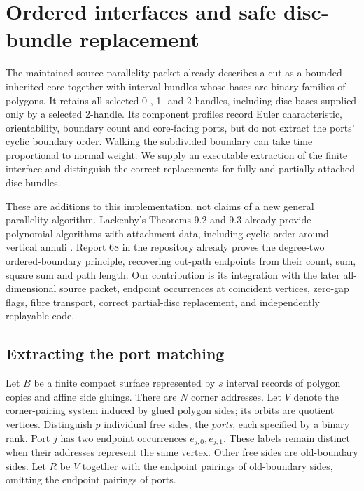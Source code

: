 \section{Ordered interfaces and safe disc-bundle replacement}
\label{sec:parallelity-interface}

The maintained source parallelity packet already describes a cut as a
bounded inherited core together with interval bundles whose bases are
binary families of polygons.  It retains all selected 0-, 1- and 2-handles,
including disc bases supplied only by a selected 2-handle.  Its component
profiles record Euler characteristic, orientability, boundary count and
core-facing ports, but do not extract the ports' cyclic boundary order.
Walking the subdivided boundary can take time proportional to normal weight.
We supply an executable extraction of the finite interface and distinguish
the correct replacements for fully and partially attached disc bundles.

These are additions to this implementation, not claims of a new general
parallelity algorithm.  Lackenby's Theorems 9.2 and 9.3 already provide
polynomial algorithms with attachment data, including cyclic order around
vertical annuli \cite{parallelity}.  Report 68 in the repository already
proves the degree-two ordered-boundary principle, recovering cut-path
endpoints from their count, sum, square sum and path length.  Our contribution
is its integration with the later all-dimensional source packet, endpoint
occurrences at coincident vertices, zero-gap flags, fibre transport, correct
partial-disc replacement, and independently replayable code.

\subsection{Extracting the port matching}

Let $B$ be a finite compact surface represented by $s$ interval records of
polygon copies and affine side gluings.  There are $N$ corner addresses.
Let $V$ denote the corner-pairing system induced by glued polygon sides;
its orbits are quotient vertices.  Distinguish $p$ individual free sides,
the \emph{ports}, each specified by a binary rank.  Port $j$ has two endpoint
occurrences $e_{j,0},e_{j,1}$.  These labels remain distinct when their
addresses represent the same vertex.  Other free sides are old-boundary
sides.  Let $R$ be $V$ together with the endpoint pairings of old-boundary
sides, omitting the endpoint pairings of ports.

